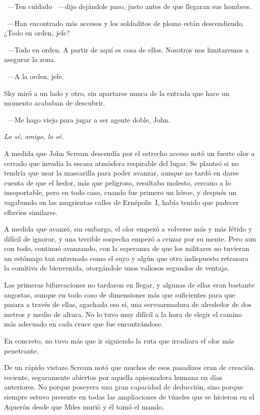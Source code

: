 ~---Ten cuidado ~---dijo dejándole paso, justo antes de que llegaran sus hombres.

~---Han encontrado más accesos y los soldaditos de plomo están descendiendo. ¿Todo en orden, jefe?

~---Todo en orden. A partir de aquí es cosa de ellos. Nosotros nos limitaremos a asegurar la zona.

~---A la orden, jefe.

Sky miró a un lado y otro, sin apartarse nunca de la entrada que hace un momento acababan de descubrir.

~---Me hago viejo para jugar a ser agente doble, John.

\emph{Lo sé, amigo, lo sé.}

\bigskip\noindent
A medida que John Scream descendía por el estrecho acceso notó un fuerte olor a cerrado que invadía la escasa atmósfera respirable del lugar. Se planteó si no tendría que usar la mascarilla para poder avanzar, aunque no tardó en darse cuenta de que el hedor, más que peligroso, resultaba molesto, cercano a lo insoportable, pero en todo caso, cuando fue primero un héroe, y después un vagabundo en las mugrientas calles de Ernépolis~I, había tenido que padecer efluvios similares.

A medida que avanzó, sin embargo, el olor empezó a volverse más y más fétido y difícil de ignorar, y una terrible sospecha empezó a cruzar por su mente. Pero aun con todo, continuó avanzando, con la esperanza de que los militares no tuvieran un estómago tan entrenado como el suyo y algún que otro indispuesto retrasara la comitiva de bienvenida, otorgándole unos valiosos segundos de ventaja.

Las primeras bifurcaciones no tardaron en llegar, y algunas de ellas eran bastante angostas, aunque en todo caso de dimensiones más que suficientes para que pasara a través de ellas, agachada eso sí, una servoarmadura de alrededor de dos metros y medio de altura. No lo tuvo muy difícil a la hora de elegir el camino más adecuado en cada cruce que fue encontrándose.

En concreto, no tuvo más que ir siguiendo la ruta que irradiara el olor más penetrante.

De un rápido vistazo Scream notó que muchos de esos pasadizos eran de creación reciente, seguramente abiertos por aquella apisonadora humana en días anteriores. No porque poseyera una gran capacidad de deducción, sino porque siempre estuvo presente en todas las ampliaciones de túneles que se hicieron en el Aquerón desde que Miles murió y él tomó el mando.

